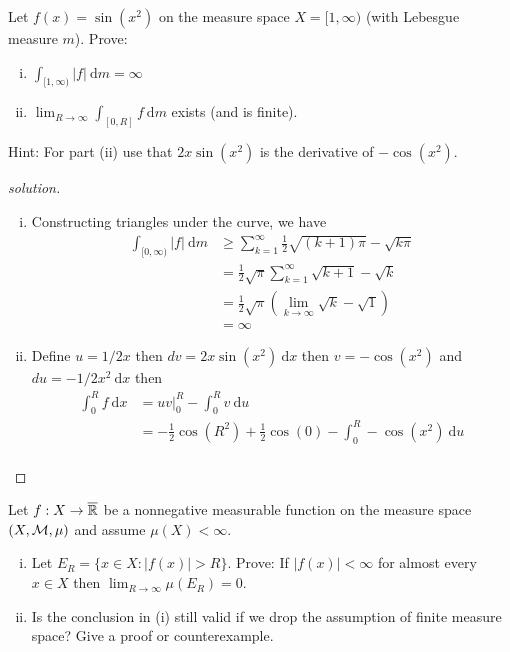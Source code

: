 \begin{problem}
  Let $f(x) = \sin(x^2)$ on the measure space $X = [1, \infty)$ (with Lebesgue measure $m$). Prove:
  \begin{enumerate}[(i)]
    \item $\int_{[1, \infty)} |f| \ \mathrm{d}m = \infty$
    \item $\lim_{R \to \infty}\int_{[0, R]} f\ \mathrm{d}m$ exists (and is finite).
  \end{enumerate}
  Hint: For part (ii) use that $2x\sin(x^2)$ is the derivative of $-\cos(x^2)$.
\end{problem}

\begin{proof}[solution]
  \begin{enumerate}[(i)]
    \item Constructing triangles under the curve, we have 
  \begin{align*}
    \int_{[0, \infty)} |f| \ \mathrm{d}m &\ge \sum_{k=1}^\infty \frac12 \sqrt{(k+1)\pi} - \sqrt{k\pi}\\
    &= \frac12\sqrt{\pi}\sum_{k=1}^\infty \sqrt{k+1} - \sqrt{k}\\
    &= \frac12\sqrt{\pi} \left(\lim_{k \to \infty} \sqrt{k} - \sqrt{1}\right) \\
    &= \infty
  \end{align*}
  \item Define $u = 1/2x$ then $dv = 2x \sin(x^2)\ \mathrm{d}x$ then $v = -\cos(x^2)$ and $du = -1/2x^2\ \mathrm{d}x$ then
  \begin{align*}
    \int_0^R f \ \mathrm{d}x &= uv\Big|_0^R - \int_0^R v\ \mathrm{d}u\\
    &= -\frac12\cos(R^2) + \frac12\cos(0) - \int_0^R -\cos(x^2)\ \mathrm{d}u\\
  \end{align*}

  \end{enumerate}
\end{proof}

\begin{problem}
  Let $f : X \to \overline{\mathbb R}$ be a nonnegative measurable function on the measure space $(X, \mathcal M, \mu)$
  and assume $\mu(X) < \infty$.
  \begin{enumerate}[(i)]
    \item Let $E_R = \{x \in X : |f(x)| > R\}$. Prove: If $|f(x)| < \infty$ for almost every $x \in X$ then 
    $\lim_{R \to \infty}\mu(E_R) = 0$.
    \item Is the conclusion in (i) still valid if we drop the assumption of finite measure space?
    Give a proof or counterexample.
  \end{enumerate}
\end{problem}


